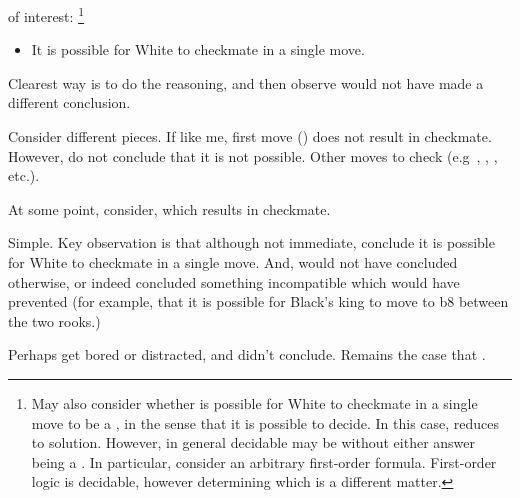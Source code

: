 \begin{note}
   of interest:%
  \footnote{
    May also consider whether is possible for White to checkmate in a single move to be a \fc{}, in the sense that it is possible to decide.
    In this case, reduces to solution.
    However, in general decidable may be \fc{} without either answer being a \fc{}.
    In particular, consider an arbitrary first-order formula.
    First-order logic is decidable, however determining which is a different matter.
  }
  \begin{itemize}
  \item
    It is possible for White to checkmate in a single move.
  \end{itemize}
  Clearest way is to do the reasoning, and then observe would not have made a different conclusion.
\end{note}

\begin{note}
  Consider different pieces.
  If like me, first move () does not result in checkmate.
  However, do not conclude that it is not possible.
  Other moves to check (e.g\ , , , etc.).

  At some point, consider, which results in checkmate.

  Simple.
  Key observation is that although not immediate, conclude it is possible for White to checkmate in a single move.
  And, would not have concluded otherwise, or indeed concluded something incompatible which would have prevented (for example, that it is possible for Black's king to move to b8 between the two rooks.)

  Perhaps get bored or distracted, and didn't conclude.
  Remains the case that \fc{}.
\end{note}

